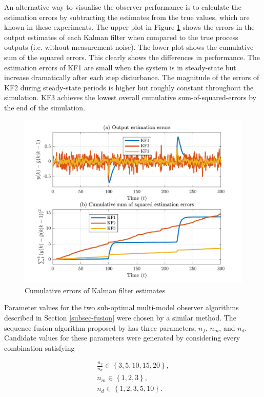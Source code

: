 An alternative way to visualise the observer performance is to calculate the estimation errors by subtracting the estimates from the true values, which are known in these experiments. The upper plot in Figure \ref{fig:sim-sys-siso-KF123-cumerr} shows the errors in the output estimates of each Kalman filter when compared to the true process outputs (i.e. without measurement noise). The lower plot shows the cumulative sum of the squared errors. This clearly shows the differences in performance. The estimation errors of KF1 are small when the system is in steady-state but increase dramatically after each step disturbance. The magnitude of the errors of KF2 during steady-state periods is higher but roughly constant throughout the simulation. KF3 achieves the lowest overall cumulative sum-of-squared-errors by the end of the simulation.
\begin{figure}[htp]
	\centering
	\includegraphics[width=14cm]{images/rod_obs_sim1_cum_err.pdf}
	\caption{Cumulative errors of Kalman filter estimates}
	\label{fig:sim-sys-siso-KF123-cumerr}
\end{figure}

Parameter values for the two sub-optimal multi-model observer algorithms described in Section \ref{subsec-fusion} were chosen by a similar method. The sequence fusion algorithm proposed by \cite{robertson_method_1998} has three parameters, $n_f$, $n_m$, and $n_d$. Candidate values for these parameters were generated by considering every combination satisfying

\begin{equation} \label{eq:sim-sys-siso-MKF-SF-param-values}
	\begin{aligned}
		\frac{n_f}{n_d} \in \left\{3, 5, 10, 15, 20\right\},  \\
		n_m \in \left\{1, 2, 3\right\},  \\
		n_d \in \left\{1, 2, 3, 5, 10\right\}.  \\
	\end{aligned}
\end{equation}

